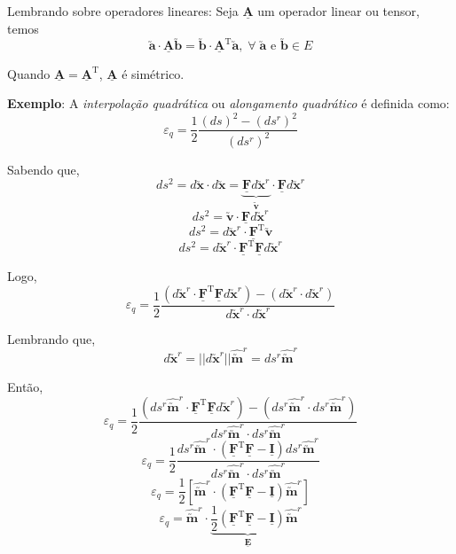	Lembrando sobre operadores lineares: Seja $\underline{\mathbf{A}}$ um operador linear ou tensor, temos
	\[\utilde{\mathbf{a}}\cdot\underline{\mathbf{A}}\utilde{\mathbf{b}}=\utilde{\mathbf{b}}\cdot\underline{\mathbf{A}}^{\text{T}}\utilde{\mathbf{a}},\;\forall\;\mathbf{\utilde{\mathbf{a}}}\text{ e }\mathbf{\utilde{\mathbf{b}}}\in\text{$E$}\]
	
	Quando $\underline{\mathbf{A}}=\underline{\mathbf{A}}^{\text{T}}$, $\underline{\mathbf{A}}$ é simétrico.
	
	\textbf{Exemplo}: A \textit{interpolação quadrática} ou \textit{alongamento quadrático} é definida como:
	\[\varepsilon_q=\frac{1}{2}\frac{(ds)^2-(ds^r)^2}{(ds^r)^2}\]
	
	Sabendo que,
	\[ds^2=d\utilde{\mathbf{x}}\cdot d\utilde{\mathbf{x}}=\underbrace{\underline{\mathbf{F}}d\utilde{\mathbf{x}}^r}_{\displaystyle\utilde{\mathbf{v}}}\cdot\underline{\mathbf{F}}d\utilde{\mathbf{x}}^r\]
	\[ds^2=\utilde{\mathbf{v}}\cdot\underline{\mathbf{F}}d\utilde{\mathbf{x}}^r\]
	\[ds^2=d\utilde{\mathbf{x}}^r\cdot\underline{\mathbf{F}}^{\text{T}}\utilde{\mathbf{v}}\]
	\[ds^2=d\utilde{\mathbf{x}}^r\cdot\underline{\mathbf{F}}^{\text{T}}\underline{\mathbf{F}}d\utilde{\mathbf{x}}^r\]
	
	Logo,
	\[\varepsilon_q=\frac{1}{2}\frac{(d\utilde{\mathbf{x}}^r\cdot\underline{\mathbf{F}}^{\text{T}}\underline{\mathbf{F}}d\utilde{\mathbf{x}}^r)-(d\utilde{\mathbf{x}}^r\cdot d\utilde{\mathbf{x}}^r)}{d\utilde{\mathbf{x}}^r\cdot d\utilde{\mathbf{x}}^r}\]
	
	Lembrando que,
	\[d\utilde{\mathbf{x}}^r=||d\utilde{\mathbf{x}}^r||\hat{\utilde{\mathbf{m}}}^r=ds^r\hat{\utilde{\mathbf{m}}}^r\]
	
	Então,
	\[\varepsilon_q=\frac{1}{2}\frac{(ds^r\hat{\utilde{\mathbf{m}}}^r\cdot\underline{\mathbf{F}}^{\text{T}}\underline{\mathbf{F}}d\utilde{\mathbf{x}}^r)-(ds^r\hat{\utilde{\mathbf{m}}}^r\cdot ds^r\hat{\utilde{\mathbf{m}}}^r)}{ds^r\hat{\utilde{\mathbf{m}}}^r\cdot ds^r\hat{\utilde{\mathbf{m}}}^r}\]
	\[\varepsilon_q=\frac{1}{2}\frac{ds^r\hat{\utilde{\mathbf{m}}}^r\cdot(\underline{\mathbf{F}}^{\text{T}}\underline{\mathbf{F}}-\underline{\mathbf{I}})ds^r\hat{\utilde{\mathbf{m}}}^r}{ds^r\hat{\utilde{\mathbf{m}}}^r\cdot ds^r\hat{\utilde{\mathbf{m}}}^r}\]
	\[\varepsilon_q=\frac{1}{2}[\hat{\utilde{\mathbf{m}}}^r\cdot(\underline{\mathbf{F}}^{\text{T}}\underline{\mathbf{F}}-\underline{\mathbf{I}})\hat{\utilde{\mathbf{m}}}^r]\]
	\[\varepsilon_q=\hat{\utilde{\mathbf{m}}}^r\cdot\underbrace{\frac{1}{2}(\underline{\mathbf{F}}^{\text{T}}\underline{\mathbf{F}}-\underline{\mathbf{I}})}_{\displaystyle\underline{\mathbf{E}}}\hat{\utilde{\mathbf{m}}}^r\]
	
